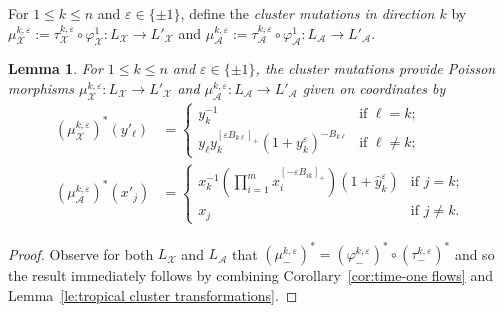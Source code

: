 \documentclass{amsart}
\newtheorem{lemma}[theorem]{Lemma}
\numberwithin{equation}{section}
\newcommand{\cA}{\mathcal{A}}
\newcommand{\cX}{\mathcal{X}}
\begin{document}
For $1\le k\le n$ and $\varepsilon\in\{\pm1\}$, define the \emph{cluster mutations in direction $k$} by $\mu_\cX^{k,\varepsilon}:=\tau_\cX^{k,\varepsilon}\circ\varphi_\cX^1:L_\cX\to L'_\cX$ and $\mu_\cA^{k,\varepsilon}:=\tau_\cA^{k,\varepsilon}\circ\varphi_\cA^1:L_\cA\to L'_\cA$.
\begin{lemma}
  \label{le:cluster mutation}
  For $1\le k\le n$ and $\varepsilon\in\{\pm1\}$, the cluster mutations provide Poisson morphisms $\mu_\cX^{k,\varepsilon}:L_\cX\to L'_\cX$ and $\mu_\cA^{k,\varepsilon}:L_\cA\to L'_\cA$ given on coordinates by
  \begin{align}
    \label{eq:X mutation}
    (\mu_\cX^{k,\varepsilon})^*(y'_\ell)&=\begin{cases} y_k^{-1} & \text{if $\ell=k$;}\\ y_\ell y_k^{[\varepsilon B_{k\ell}]_+}(1+y_k^\varepsilon)^{-B_{k\ell}} & \text{if $\ell\ne k$;}\end{cases}\\
    \label{eq:A mutation}
    (\mu_\cA^{k,\varepsilon})^*(x'_j)&=\begin{cases} x_k^{-1}\left(\prod\limits_{i=1}^m x_i^{[-\varepsilon B_{ik}]_+}\right)(1+\hat y_k^\varepsilon) & \text{if $j=k$;}\\ x_j & \text{if $j\ne k$.}\end{cases}
  \end{align}
\end{lemma}
\begin{proof}
  Observe for both $L_\cX$ and $L_\cA$ that $(\mu_-^{k,\varepsilon})^*=(\varphi_-^{k,\varepsilon})^*\circ(\tau_-^{k,\varepsilon})^*$ and so the result immediately follows by combining Corollary~\ref{cor:time-one flows} and Lemma~\ref{le:tropical cluster transformations}.
\end{proof}
\end{document}
